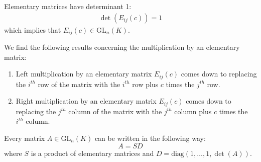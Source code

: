         \begin{property}
        	Elementary matrices have determinant 1:
		\begin{gather}
			\det(E_{ij}(c)) = 1
		\end{gather}
		which implies that $E_{ij}(c)\in\text{GL}_n(K)$.
	\end{property}
        \begin{property}
		We find the following results concerning the multiplication by an elementary matrix:
	        \begin{enumerate}
			\item Left multiplication by an elementary matrix $E_{ij}(c)$ comes down to replacing the $i^{th}$ row of the matrix with the $i^{th}$ row plus $c$ times the $j^{th}$ row.
                	\item Right multiplication by an elementary matrix $E_{ij}(c)$ comes down to replacing the $j^{th}$ column of the matrix with the $j^{th}$ column plus $c$ times the $i^{th}$ column.
		\end{enumerate}
	\end{property}

        \begin{property}\label{linalgebra:theorem:elementary_matrices}
		Every matrix $A\in\text{GL}_n(K)$ can be written in the following way: \[A = SD\] where $S$ is a product of elementary matrices and $D=\text{diag}(1,\dotso,1,\det(A))$.
	\end{property}
        
